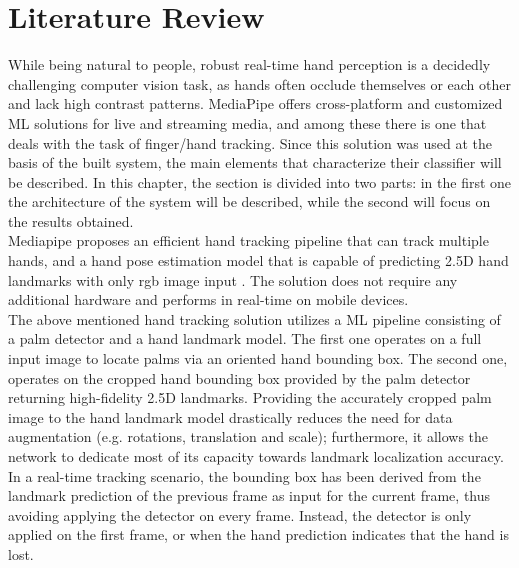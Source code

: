 \setcounter{chapter}{0}
\chapter{Literature Review}
\label{chap:stateoftheart}


While being natural to people, robust real-time hand perception is a decidedly challenging computer vision task, as hands often occlude themselves or each other and lack high contrast patterns. MediaPipe \cite[]{lugaresi2019mediapipe} offers cross-platform and customized ML solutions for live and streaming media, and among these there is one that deals with the task of finger/hand tracking. Since this solution was used at the basis of the built system, the main elements that characterize their classifier will be described. In this chapter, the section is divided into two parts: in the first one the architecture of the system will be described, while the second will focus on the results obtained. \\

\noindent Mediapipe proposes an efficient hand tracking pipeline that can track multiple hands, and a hand pose estimation model that is capable of predicting 2.5D hand landmarks with only \gls{rgb} image input \cite[]{zhang2020mediapipe}. The solution does not require any additional hardware and performs in real-time on mobile devices. \\

\noindent The above mentioned hand tracking solution utilizes a ML pipeline consisting of a palm detector and a hand landmark model. The first one operates on a full input image to locate palms via an oriented hand bounding box. The second one, operates on the cropped hand bounding box provided by the palm detector returning high-fidelity 2.5D landmarks. Providing the accurately cropped palm image to the hand landmark model drastically reduces the need for data augmentation (e.g. rotations, translation and scale); furthermore, it allows the network to dedicate most of its capacity towards landmark localization accuracy. In a real-time tracking scenario, the bounding box has been derived from the landmark prediction of the previous frame as input for the current frame, thus avoiding applying the detector on every frame. Instead, the detector is only applied on the first frame, or when the hand prediction indicates that the hand is lost. \\

